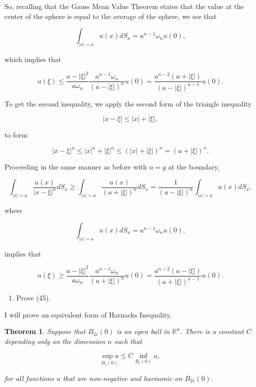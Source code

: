 \documentclass{article}
\newtheorem{theorem}{Theorem}
\begin{document}
So, recalling that the Gauss Mean Value Theorem states that the value at the center of the sphere is equal to the average of the sphere, we see that

$$\int_{|x|=a}u(x)dS_x = a^{n-1}\omega_n u(0),$$

which implies that 

$$u(\xi)\leq \frac{a-|\xi|^2}{a\omega_n} \frac{a^{n-1}\omega_n }{(a-|\xi|)^n}u(0)=\frac{a^{n-2}(a+|\xi|)}{(a-|\xi|)^{n-1}}u(0).$$

To get the second inequality, we apply the second form of the triangle inequality

$$|x-\xi| \leq |x|+|\xi|,$$

to form

$$|x-\xi|^n \leq |x|^n +|\xi|^n \leq (|x| +|\xi|)^n = (a+|\xi|)^n.$$

Proceeding in the same manner as before with $u=g$ at the boundary,

$$\int_{|x|=a}\frac{u(x)}{|x-\xi|^n}dS_x \geq \int_{|x|=a}\frac{u(x)}{(a+|\xi|)^n}dS_x = 
\frac{1}{(a-|\xi|)^n}\int_{|x|=a}u(x)dS_x, $$

where

$$\int_{|x|=a}u(x)dS_x = a^{n-1}\omega_n u(0),$$

implies that

$$u(\xi)\geq \frac{a-|\xi|^2}{a\omega_n} \frac{a^{n-1}\omega_n }{(a+|\xi|)^n}u(0)=\frac{a^{n-2}(a-|\xi|)}{(a+|\xi|)^{n-1}}u(0).$$

\begin{enumerate}[label=(\alph*),start=2]
    \item Prove (45).
\end{enumerate}

I will prove an equivalent form of Harnack\textsc{}s Inequality. 

\begin{theorem}\label{pythagorean} Suppose that $B_{2r}(0)$ is an open ball in $\mathbb R^n$. There is a constant $C$ depending only on the dimension $n$ such that

$$ \underset{B_r(0)}{\sup u} \leq C \underset{B_r(0)}\inf u,$$

for all functions $u$ that are non-negative and harmonic on $B_{2r}(0)$.\end{theorem}
\end{document}
